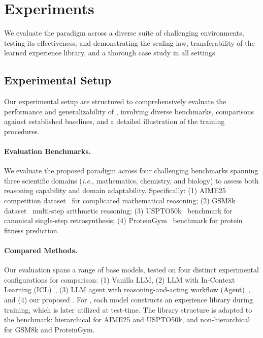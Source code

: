 \section{Experiments}
We evaluate the \method{} paradigm across a diverse suite of challenging environments, testing its effectiveness, and demonstrating the scaling law, transferability of the learned experience library, and a thorough case study in all settings.

\subsection{Experimental Setup}
Our experimental setup are structured to comprehensively evaluate the performance and generalizability of \method{}, involving diverse benchmarks, comparisons against established baselines, and a detailed illustration of the training procedures.

\paragraph{Evaluation Benchmarks.}
We evaluate the proposed \method{} paradigm across four challenging benchmarks spanning three scientific domains (\textit{i.e.}, mathematics, chemistry, and biology) to assess both reasoning capability and domain adaptability. Specifically: (1) AIME25 competition dataset~\cite{aime2025problems} for complicated mathematical reasoning; (2) GSM8k dataset~\cite{cobbe2021gsm8k} multi-step arithmetic reasoning; (3) USPTO50k~\cite{schneider2016s} benchmark for canonical single-step retrosynthesis; (4) ProteinGym~\cite{notin2023proteingym} benchmark for protein fitness prediction. 

\paragraph{Compared Methods.}
Our evaluation spans a range of base models, tested on four distinct experimental configurations for comparison: (1) Vanilla LLM, (2) LLM with In-Context Learning (ICL)~\cite{dong2022survey}, (3) LLM agent with reasoning-and-acting workflow (Agent)~\cite{yao2023reactsynergizingreasoningacting}, and (4) our proposed \method{}. For \method{}, each model constructs an experience library during training, which is later utilized at test-time. The library structure is adapted to the benchmark: hierarchical  for AIME25 and USPTO50k, and non-hierarchical for GSM8k and ProteinGym.

